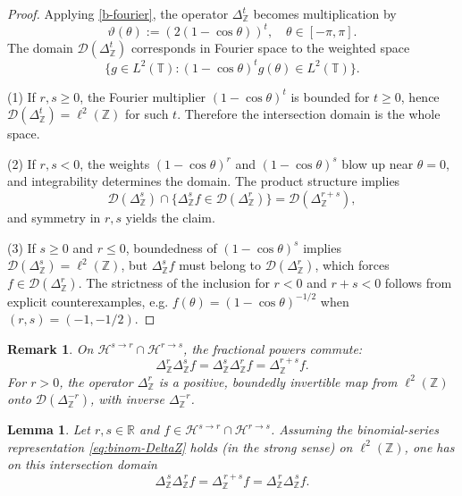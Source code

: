 \documentclass[10pt]{amsart} %
\newcommand{\1}{{\mathbb{I}}}
\numberwithin{equation}{section}
\newtheorem{lemma}[theorem]{Lemma}%
\newtheorem{remark}[theorem]{Remark}%
\begin{document}
\begin{proof}
Applying \eqref{b-fourier}, the operator $\Delta_{\mathbb{Z}}^{t}$ becomes multiplication by
\[
\vartheta(\theta) := \left( 2(1 - \cos \theta) \right)^{t}, \quad \theta \in [-\pi,\pi].
\]
The domain $\mathcal{D}(\Delta_{\mathbb{Z}}^{t})$ corresponds in Fourier space to the weighted space
\[
\{ g \in L^2(\mathbb{T}) : (1 - \cos \theta)^{t} g(\theta) \in L^2(\mathbb{T}) \}.
\]

\smallskip\noindent
(1) If $r,s \ge 0$, the Fourier multiplier $(1 - \cos \theta)^t$ is bounded for $t \ge 0$, hence $\mathcal{D}(\Delta_{\mathbb{Z}}^{t}) = \ell^2(\mathbb{Z})$ for such $t$. Therefore the intersection domain is the whole space.

\smallskip\noindent
(2) If $r,s < 0$, the weights $(1 - \cos \theta)^{r}$ and $(1 - \cos \theta)^{s}$ blow up near $\theta = 0$, and integrability determines the domain. The product structure implies
\[
\mathcal{D}(\Delta_{\mathbb{Z}}^{s}) \cap \{ \Delta_{\mathbb{Z}}^{s} f \in \mathcal{D}(\Delta_{\mathbb{Z}}^{r}) \} = \mathcal{D}(\Delta_{\mathbb{Z}}^{r+s}),
\]
and symmetry in $r,s$ yields the claim.

\smallskip\noindent
(3) If $s \ge 0$ and $r \le 0$, boundedness of $(1 - \cos \theta)^{s}$ implies $\mathcal{D}(\Delta_{\mathbb{Z}}^{s}) = \ell^2(\mathbb{Z})$, but $\Delta_{\mathbb{Z}}^{s} f$ must belong to $\mathcal{D}(\Delta_{\mathbb{Z}}^{r})$, which forces $f \in \mathcal{D}(\Delta_{\mathbb{Z}}^{r})$. The strictness of the inclusion for $r < 0$ and $r+s < 0$ follows from explicit counterexamples, e.g. $f(\theta) = (1 - \cos \theta)^{-1/2}$ when $(r,s) = (-1,-1/2)$.
\end{proof}

\begin{remark}
On $\mathcal{H}^{s \to r} \cap \mathcal{H}^{r \to s}$, the fractional powers commute:
\[
\Delta_{\mathbb{Z}}^{r} \Delta_{\mathbb{Z}}^{s} f = \Delta_{\mathbb{Z}}^{s} \Delta_{\mathbb{Z}}^{r} f = \Delta_{\mathbb{Z}}^{r+s} f.
\]
For $r > 0$, the operator $\Delta_{\mathbb{Z}}^{r}$ is a positive, boundedly invertible map from $\ell^2(\mathbb{Z})$ onto $\mathcal{D}(\Delta_{\mathbb{Z}}^{-r})$, with inverse $\Delta_{\mathbb{Z}}^{-r}$.
\end{remark}

\begin{lemma}
Let $r,s\in\mathbb{R}$ and $f\in\mathcal{H}^{s\to r}\cap\mathcal{H}^{r\to s}$.
Assuming the binomial-series representation \eqref{eq:binom-DeltaZ} holds (in the strong sense) on $\ell^2(\mathbb{Z})$,
one has on this intersection domain
\[
\Delta_{\mathbb{Z}}^{\,s}\Delta_{\mathbb{Z}}^{\,r} f
=\Delta_{\mathbb{Z}}^{\,r+s} f
=\Delta_{\mathbb{Z}}^{\,r}\Delta_{\mathbb{Z}}^{\,s} f .
\]
\end{lemma}
\end{document}
